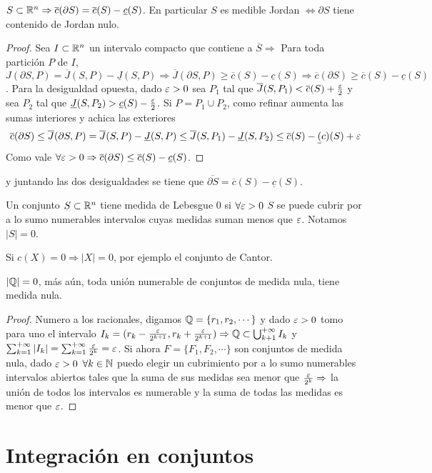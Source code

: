 \begin{theorem}
  $S \subset \mathbb{R}^n \Rightarrow \overline{c}(\partial S) = \overline{c}(S) - \underline{c}(S)$. En particular $S$ es medible Jordan $\iff \partial S$ tiene contenido de Jordan nulo.
  \begin{proof}
    Sea $I \subset \mathbb{R}^n$ un intervalo compacto que contiene a $\overline{S} \Rightarrow$ Para toda partición $P$ de $I$, $J(\partial S, P) = \overline{J}(S, P) - \underline{J}(S, P) \Rightarrow \overline{J}(\partial S, P) \geq \overline{c}(S) - \underline{c}(S) \Rightarrow \overline{c}(\partial S) \geq \overline{c}(S) - \underline{c}(S)$. Para la desigualdad opuesta, dado $\varepsilon > 0$ sea $P_1$ tal que $\overline{J}(S, P_1) < \overline{c}(S) + \frac{\varepsilon}{2}$ y sea $P_2$ tal que $\underline{J}(S, P_2) > \underline{c}(S) - \frac{\varepsilon}{2}$. Si $P = P_1 \cup P_2$, como refinar aumenta las sumas interiores y achica las exteriores \begin{equation}
      \overline{c}(\partial S) \leq \overline{J}(\partial S, P) = \overline{J}(S, P) - \underline{J}(S, P) \leq \overline{J}(S, P_1) - \underline{J}(S, P_2) \leq \overline{c}(S) - \underline(c)(S) + \varepsilon
    \end{equation}
    Como vale $\forall \varepsilon > 0 \Rightarrow \overline{c}(\partial S) \leq \overline{c}(S) - \underline{c}(S)$.
  \end{proof} y juntando las dos desigualdades se tiene que $\overline{\partial S} = \overline{c}(S) - \underline{c}(S)$.
\end{theorem}

\begin{definition}
  Un conjunto $S \subset \mathbb{R}^n$ tiene medida de Lebesgue $0$ si $\forall \varepsilon > 0$ $S$ se puede cubrir por a lo sumo numerables intervalos cuyas medidas suman menos que $\varepsilon$. Notamos $|S| = 0$.
\end{definition}

\begin{eg}
  Si $c(X) = 0 \Rightarrow |X| = 0$, por ejemplo el conjunto de Cantor.
\end{eg}

\begin{eg}
  $|\mathbb{Q}| = 0$, más aún, toda unión numerable de conjuntos de medida nula, tiene medida nula.
  \begin{proof}
    Numero a los racionales, digamos $\mathbb{Q} = \{r_1, r_2, \cdots\}$ y dado $\varepsilon > 0$ tomo para uno el intervalo $I_k = (r_k - \frac{\varepsilon}{2^{k+1}}, r_k + \frac{\varepsilon}{2^{k+1}}) \Rightarrow \mathbb{Q} \subset \bigcup_{k + 1}^{+\infty} I_k$ y $\sum_{k = 1}^{+\infty} |I_k| = \sum_{k = 1}^{+\infty} \frac{\varepsilon}{2^k} = \varepsilon$.
    Si ahora $F = \{F_1, F_2, \cdots\}$ son conjuntos de medida nula, dado $\varepsilon > 0$ $\forall k \in \mathbb{N}$ puedo elegir un cubrimiento por a lo sumo numerables intervalos abiertos tales que la suma de sus medidas sea menor que $\frac{\varepsilon}{2^k} \Rightarrow$ la unión de todos los intervalos es numerable y la suma de todas las medidas es menor que $\varepsilon$.
  \end{proof}
\end{eg}

\section{Integración en conjuntos}
